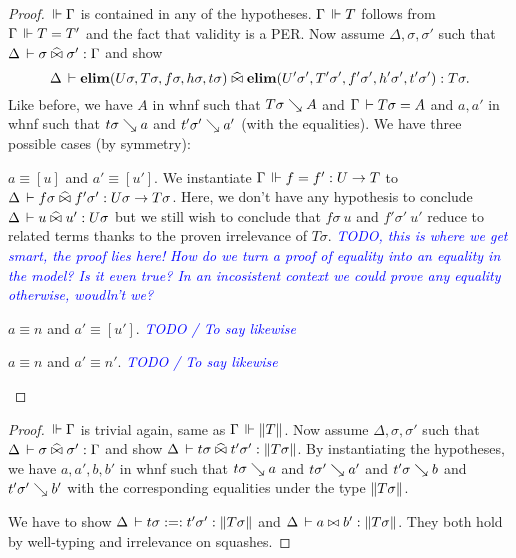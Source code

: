 \documentclass[a4paper,english]{lipics-utf8x}
\newcommand\meta[1]{\noindent\textcolor{blue}{\emph{#1}}}
\begin{document}
  \begin{proof}
    $\,\Vdash \Gamma$ is contained in any of the hypotheses.
    $\Gamma \,\Vdash T$ follows from $\Gamma \,\Vdash T = T'$ and the fact that validity
    is a PER.
    Now assume $\Delta, \sigma, \sigma'$ such that
    $\Delta \,\vdash \sigma \mathrel{\widehat{\bowtie}} \sigma' : \Gamma$ and
    show
    \[\Delta \,\vdash \operatorname{\mathbf{elim}}(U \sigma,T \sigma,f \sigma,h \sigma,t \sigma) \mathrel{\widehat{\bowtie}}
    \operatorname{\mathbf{elim}}(U' \sigma',T' \sigma',f' \sigma',h' \sigma',t' \sigma') : T \sigma.\]
    Like before, we have $A$ in whnf such that $T \sigma \searrow A$ and
    $\Gamma \,\vdash T \sigma = A$ and $a,a'$ in whnf such that $t \sigma \searrow a$
    and $t' \sigma' \searrow a'$ (with the equalities).
    We have three possible cases (by symmetry):
    \begin{caselist}
      \nextcase $a \equiv [u]$ and $a' \equiv [u']$.
      We instantiate $\Gamma \,\Vdash f = f' : U \to T$ to
      $\Delta \,\vdash f \sigma \mathrel{\widehat{\bowtie}} f' \sigma' : U \sigma \to T \sigma$.
      Here, we don't have any hypothesis to conclude
      $\Delta \,\vdash u \mathrel{\widehat{\bowtie}} u' : U \sigma$ but we still wish to conclude that
      $f \sigma\ u$ and $f' \sigma'\ u'$ reduce to related terms thanks to
      the proven irrelevance of $T \sigma$.
      \meta{TODO, this is where we get smart, the proof lies here!}
      \meta{How do we turn a proof of equality into an equality in the model?
      Is it even true? In an incosistent context we could prove any equality
      otherwise, woudln't we?}

      \nextcase $a \equiv n$ and $a' \equiv [u']$.
      \meta{TODO / To say likewise}

      \nextcase $a \equiv n$ and $a' \equiv n'$.
      \meta{TODO / To say likewise}
    \end{caselist}
  \end{proof}

  \begin{lemma}
    \leavevmode
    \begin{mathc}
    \end{mathc}
  \end{lemma}

  \begin{proof}
    $\,\Vdash \Gamma$ is trivial again, same as $\Gamma \,\Vdash \|T\|$.
    Now assume $\Delta, \sigma, \sigma'$ such that
    $\Delta \,\vdash \sigma \mathrel{\widehat{\bowtie}} \sigma' : \Gamma$ and
    show $\Delta \,\vdash t \sigma \mathrel{\widehat{\bowtie}} t' \sigma' : \|T \sigma\|$.
    By instantiating the hypotheses, we have $a,a',b,b'$ in whnf such that
    $t \sigma \searrow a$ and $t \sigma' \searrow a'$ and $t' \sigma \searrow b$
    and $t' \sigma' \searrow b'$ with the corresponding equalities under the type
    $\|T \sigma\|$.

    We have to show $\Delta \,\vdash t \sigma :=: t' \sigma' : \|T \sigma\|$
    and $\Delta \,\vdash a \mathrel{\bowtie} b' : \|T \sigma\|$. They both hold by
    well-typing and irrelevance on squashes.
  \end{proof}
\end{document}
